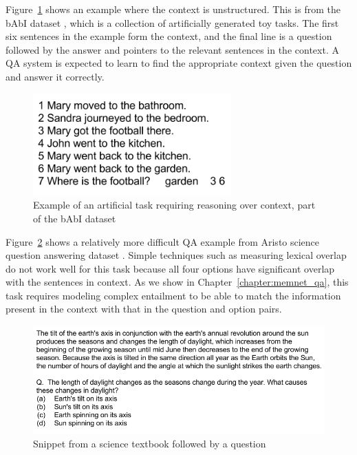 Figure~\ref{fig:babi_example} shows an example where the context is unstructured. This is from the bAbI dataset \citep{weston2015towards}, which is a collection of artificially generated toy tasks.
The first six sentences in the example
form the context, and the final line is a question followed by the answer and pointers to the relevant sentences in the context. A QA system is expected to learn to find the appropriate context
given the question and answer it correctly.
\begin{figure}
\begin{center}
\includegraphics[width=3in]{figures/bAbI_example.png}
\caption{Example of an artificial task requiring reasoning over context, part of the bAbI dataset}
\label{fig:babi_example}
\end{center}
\end{figure}

Figure~\ref{fig:science_qa_example} shows a relatively more difficult QA example from Aristo science question answering dataset \citep{clark2015elementary}. Simple techniques such as measuring lexical overlap do not
work well for this task because all four options have significant overlap with the sentences in context. As we show in Chapter~\ref{chapter:memnet_qa}, this task requires modeling complex entailment to be able to match the information present in the context with that in the question and
option pairs.
\begin{figure}
\begin{center}
\includegraphics[width=6in]{figures/science_qa_example.png}
\caption{Snippet from a science textbook followed by a question}
\label{fig:science_qa_example}
\end{center}
\end{figure}


